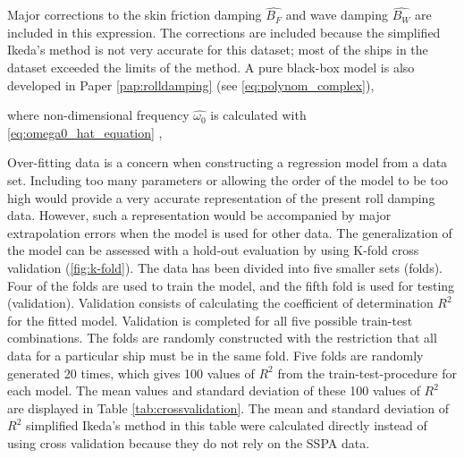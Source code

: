 \noindent Major corrections to the skin friction damping $\hat{B_F}$ and wave damping $\hat{B_W}$ are included in this expression. The corrections are included because the simplified Ikeda's method is not very accurate for this dataset; most of the ships in the dataset exceeded the limits of the method. A pure black-box model is also developed in Paper \ref{pap:rolldamping} (see \autoref{eq:polynom_complex}),

\noindent where non-dimensional frequency $\hat{\omega_0}$ is calculated with \autoref{eq:omega0_hat_equation} \cite{himeno_prediction_1981},

Over-fitting data is a concern when constructing a regression model from a data set. Including too many parameters or allowing the order of the model to be too high would provide a very accurate representation of the present roll damping data. However, such a representation would be accompanied by major extrapolation errors when the model is used for other data. The generalization of the model can be assessed with a hold-out evaluation by using K-fold cross validation \cite{mosteller_handbook_1968} (\autoref{fig:k-fold}). The data has been divided into five smaller sets (folds). Four of the folds are used to train the model, and the fifth fold is used for testing (validation). Validation consists of calculating the coefficient of determination $R^2$ for the fitted model. Validation is completed for all five possible train-test combinations. 
The folds are randomly constructed with the restriction that all data for a particular ship must be in the same fold. Five folds are randomly generated 20 times, which gives 100 values of $R^2$ from the train-test-procedure for each model. The mean values and standard deviation of these 100 values of $R^2$ are displayed in Table \ref{tab:crossvalidation}. The mean and standard deviation of $R^2$ simplified Ikeda's method in this table were calculated directly instead of using cross validation because they do not rely on the SSPA data.

\clearpage
